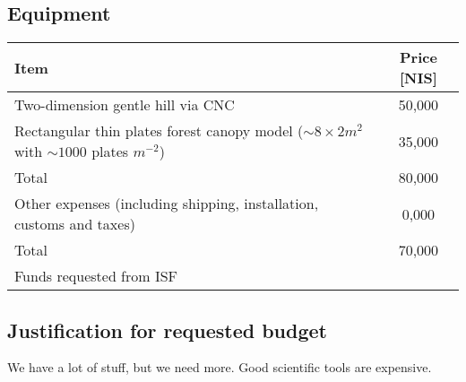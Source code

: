 \documentclass[a4paper,12pt]{report}
\begin{document}
\subsection*{Equipment } 
\begin{table}[h!]
\centering
\begin{tabular}{|l|c|}
\hline
  Item  & Price [NIS] \\
\hline
Two-dimension gentle hill via CNC & 50,000  \\
\hline
Rectangular thin plates forest canopy model ($\sim 8\times 2 m^2$ with $\sim 1000$ plates $m^{-2}$) & 35,000\\
\hline
\hline
Total & 80,000\\
\hline
Other expenses (including shipping,
installation, customs and taxes) & 0,000 \\
\hline
\hline
\hline
Total & 70,000 \\
\hline
 Funds requested from ISF & \\
 \hline
\end{tabular}
\end{table}

\newpage

\subsection*{Justification for requested budget }

We have a lot of stuff, but we need more. Good scientific tools are expensive. 



\end{document}
